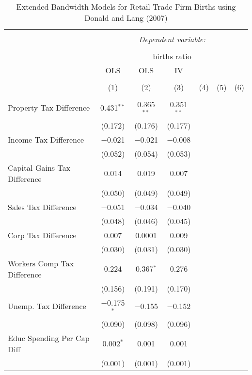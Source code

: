 
\begin{table}[!htbp] \centering 
  \caption{Extended Bandwidth Models for  Retail Trade Firm Births using Donald and Lang (2007)} 
  \label{} 
\begin{tabular}{@{\extracolsep{5pt}}lcccccc} 
\\[-1.8ex]\hline 
\hline \\[-1.8ex] 
 & \multicolumn{6}{c}{\textit{Dependent variable:}} \\ 
\cline{2-7} 
\\[-1.8ex] & \multicolumn{6}{c}{births ratio} \\ 
 & OLS & OLS & IV &  &  &  \\ 
\\[-1.8ex] & (1) & (2) & (3) & (4) & (5) & (6)\\ 
\hline \\[-1.8ex] 
 Property Tax Difference & 0.431$^{**}$ & 0.365$^{**}$ & 0.351$^{**}$ &  &  &  \\ 
  & (0.172) & (0.176) & (0.177) &  &  &  \\ 
  Income Tax Difference & $-$0.021 & $-$0.021 & $-$0.008 &  &  &  \\ 
  & (0.052) & (0.054) & (0.053) &  &  &  \\ 
  Capital Gains Tax Difference & 0.014 & 0.019 & 0.007 &  &  &  \\ 
  & (0.050) & (0.049) & (0.049) &  &  &  \\ 
  Sales Tax Difference & $-$0.051 & $-$0.034 & $-$0.040 &  &  &  \\ 
  & (0.048) & (0.046) & (0.045) &  &  &  \\ 
  Corp Tax Difference & 0.007 & 0.0001 & 0.009 &  &  &  \\ 
  & (0.030) & (0.031) & (0.030) &  &  &  \\ 
  Workers Comp Tax Difference & 0.224 & 0.367$^{*}$ & 0.276 &  &  &  \\ 
  & (0.156) & (0.191) & (0.170) &  &  &  \\ 
  Unemp. Tax Difference & $-$0.175$^{*}$ & $-$0.155 & $-$0.152 &  &  &  \\ 
  & (0.090) & (0.098) & (0.096) &  &  &  \\ 
  Educ Spending Per Cap Diff & 0.002$^{*}$ & 0.001 & 0.001 &  &  &  \\ 
  & (0.001) & (0.001) & (0.001) &  &  &  \\ 

\end{tabular}
\end{table}
